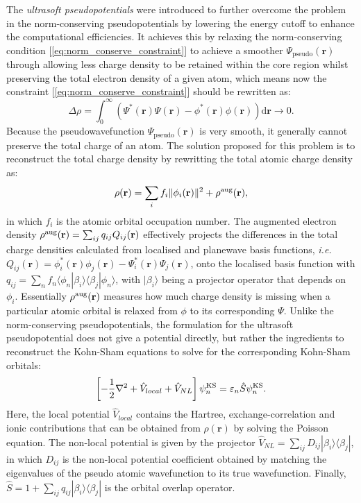 The \emph{ultrasoft pseudopotentials}\cite{laasonen1991implementation,kresse1999ultrasoft} were introduced to further overcome the problem in the norm-conserving pseudopotentials by lowering the energy cutoff to enhance the computational efficiencies. It achieves this by  relaxing the norm-conserving condition [\cref{eq:norm_conserve_constraint}] to achieve a smoother $\Psi_{\mathrm{pseudo}}(\bm{r})$ through allowing less charge density to be retained within the core region whilst preserving the total electron density of a given atom, which means now the constraint [\cref{eq:norm_conserve_constraint}] should be rewritten as:
\begin{equation}
    \label{eq:ultrasoft_PP_charge_constraint}
    \Delta \rho=\int_0^\infty \left(\Psi^* (\bm{r})\Psi(\bm{r})-\phi^*(\bm{r})\phi(\bm{r})\right)\mbox{d}\bm{r}\to 0.
\end{equation}
Because the pseudowavefunction $\Psi_{\mathrm{pseudo}}(\bm{r})$ is very smooth, it generally cannot preserve the total charge of an atom. The solution proposed for this problem is to reconstruct the total charge density by rewritting the total atomic charge density as:
\begin{equation*}
    \rho(\mathbf{r})=\sum_{i}f_i \|\phi_i (\mathbf{r})\|^2+\rho^{\mbox{\scriptsize{aug}}}(\mathbf{r}),
\end{equation*}
in which $f_i$ is the atomic orbital occupation number. The augmented electron density $\rho^{\mbox{\scriptsize{aug}}}(\mathbf{r})=\sum_{ij}q_{ij}Q_{ij}(\mathbf{r})$ effectively projects the differences in the total charge densities calculated from localised and planewave basis functions, \emph{i.e.} $Q_{ij}(\bm{r})=\phi_{i}^{*}(\bm{r})\phi_{j}(\bm{r})-\Psi_{i}^{*}(\bm{r})\Psi_{j}(\bm{r})$, onto the localised basis function with $q_{ij}=\sum_n f_n \langle \phi_n|\beta_i\rangle\langle\beta_j |\phi_n\rangle$, with $|\beta_i\rangle$ being a projector operator that depends on $\phi_i$. Essentially $\rho^{\mbox{\scriptsize{aug}}}(\mathbf{r})$ measures how much charge density is missing when a particular atomic orbital is relaxed from $\phi$ to its corresponding $\Psi$. Unlike the norm-conserving pseudopotentials, the formulation for the ultrasoft pseudopotential does not give a potential directly, but rather the ingredients to reconstruct the Kohn-Sham equations to solve for the corresponding Kohn-Sham orbitals:
\begin{equation*}
    \left[-\frac{1}{2}\nabla^2+\hat{V}_{local}+\hat{V}_{NL}\right]\psi_n^{\mbox{\scriptsize{KS}}}=\varepsilon_n  \hat{S} \psi_n^{\mbox{\scriptsize{KS}}}.
\end{equation*}
Here, the local potential $\hat{V}_{local}$ contains the Hartree, exchange-correlation and ionic contributions that can be obtained from $\rho(\bm{r})$ by solving the Poisson equation. The non-local potential is given by the projector $\hat{V}_{NL}=\sum_{ij}D_{ij}|\beta_i\rangle\langle\beta_j|$, in which $D_{ij}$ is the non-local potential coefficient obtained by matching the eigenvalues of the pseudo atomic wavefunction to its true wavefunction. Finally, $\hat{S}=1+\sum_{ij}q_{ij}|\beta_i\rangle\langle\beta_j|$ is the orbital overlap operator. 

